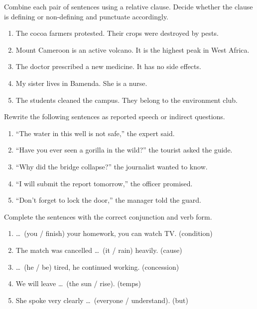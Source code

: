 \documentclass[11pt]{article}
\begin{document}
\begin{exercice}
Combine each pair of sentences using a relative clause. Decide whether the clause is defining or non-defining and punctuate accordingly.
\begin{enumerate}
\item The cocoa farmers protested. Their crops were destroyed by pests.
\item Mount Cameroon is an active volcano. It is the highest peak in West Africa.
\item The doctor prescribed a new medicine. It has no side effects.
\item My sister lives in Bamenda. She is a nurse.
\item The students cleaned the campus. They belong to the environment club.
\end{enumerate}
\end{exercice}

\begin{exercice}
Rewrite the following sentences as reported speech or indirect questions.
\begin{enumerate}
\item “The water in this well is not safe,” the expert said.
\item “Have you ever seen a gorilla in the wild?” the tourist asked the guide.
\item “Why did the bridge collapse?” the journalist wanted to know.
\item “I will submit the report tomorrow,” the officer promised.
\item “Don't forget to lock the door,” the manager told the guard.
\end{enumerate}
\end{exercice}

\begin{exercice}
Complete the sentences with the correct conjunction and verb form.
\begin{enumerate}
\item \ldots\ (you / finish) your homework, you can watch TV. (condition)
\item The match was cancelled \ldots\ (it / rain) heavily. (cause)
\item \ldots\ (he / be) tired, he continued working. (concession)
\item We will leave \ldots\ (the sun / rise). (temps)
\item She spoke very clearly \ldots\ (everyone / understand). (but)
\end{enumerate}
\end{exercice}
\end{document}
